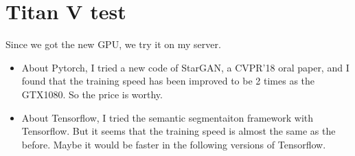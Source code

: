 \documentclass[]{IEEEtran}
\begin{document}
\section{Titan V test}
	Since we got the new GPU, we try it on my server.
	\begin{itemize}
		\item About Pytorch, I tried a new code of StarGAN, a CVPR'18 oral paper, and I found that the training speed has been improved to be 2 times as the GTX1080. So the price is worthy.
		\item About Tensorflow, I tried the semantic segmentaiton framework with Tensorflow. But it seems that the training speed is almost the same as the before. Maybe it would be faster in the following versions of Tensorflow.
	\end{itemize}
\newpage
\end{document}
